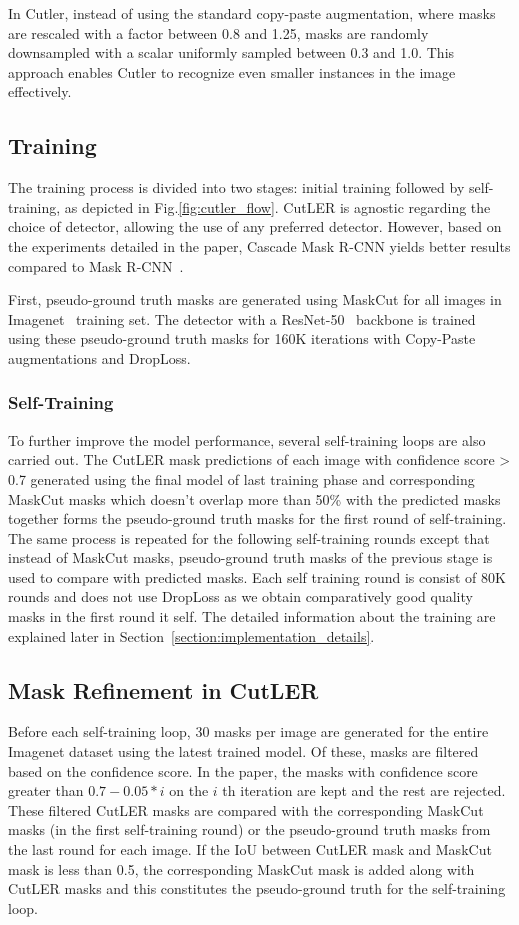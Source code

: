 In Cutler, instead of using the standard copy-paste augmentation, where masks are rescaled with a factor between 0.8 and 1.25, masks are randomly downsampled with a scalar uniformly sampled between 0.3 and 1.0. This approach enables Cutler to recognize even smaller instances in the image effectively.

\subsection{Training}
The training process is divided into two stages: initial training followed by self-training, as depicted in Fig.\ref{fig:cutler_flow}. CutLER is agnostic regarding the choice of detector, allowing the use of any preferred detector. However, based on the experiments detailed in the paper, Cascade Mask R-CNN\cite{cai2019cascadercnnhighquality} yields better results compared to Mask R-CNN~\cite{he2018maskrcnn}.

First, pseudo-ground truth masks are generated using MaskCut for all images in Imagenet~\cite{deng2009imagenet} training set. The detector with a ResNet-50~\cite{he2015deepresiduallearningimage} backbone is trained using these pseudo-ground truth masks for 160K iterations with Copy-Paste augmentations and DropLoss.

\subsubsection{Self-Training}
To further improve the model performance, several self-training loops are also carried out. The CutLER mask predictions of each image with confidence score > 0.7 generated using the final model of last training phase and corresponding MaskCut masks which doesn't overlap more than 50\% with the predicted masks together forms the pseudo-ground truth masks for the first round of self-training. The same process is repeated for the following self-training rounds except that instead of MaskCut masks, pseudo-ground truth masks of the previous stage is used to compare with predicted masks. Each self training round is consist of 80K rounds and does not use DropLoss as we obtain comparatively good quality masks in the first round it self. The detailed information about the training are explained later in Section~\ref{section:implementation_details}.

\subsection{Mask Refinement in CutLER}
Before each self-training loop, 30 masks per image are generated for the entire Imagenet dataset using the latest trained model. Of these, masks are filtered based on the confidence score. In the paper, the masks with confidence score greater than \(0.7 - 0.05 * i\) on the \(i\) th iteration are kept and the rest are rejected. These filtered CutLER masks are compared with the corresponding MaskCut masks (in the first self-training round) or the pseudo-ground truth masks from the last round for each image. If the IoU between CutLER mask and MaskCut mask is less than 0.5, the corresponding MaskCut mask is added along with CutLER masks and this constitutes the pseudo-ground truth for the self-training loop.

